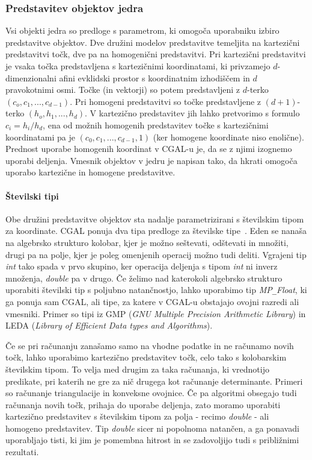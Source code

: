 \documentclass[a4paper, 12pt]{book}
\newcommand{\U}{\texttt{\_}}
\begin{document}
\subsubsection{Predstavitev objektov jedra}
Vsi objekti jedra so predloge s parametrom, ki omogoča uporabniku izbiro predstavitve objektov. Dve družini modelov predstavitve temeljita na kartezični predstavitvi točk, dve pa na homogenični predstavitvi. Pri kartezični predstavitvi je vsaka točka predstavljena s kartezičnimi koordinatami, ki privzamejo $d$-dimenzionalni afini evklidski prostor s koordinatnim izhodiščem in $d$ pravokotnimi osmi. Točke (in vektorji) so potem predstavljeni z $d$-terko $(c_o, c_1,..., c_{d-1})$. Pri homogeni predstavitvi so točke predstavljene z $(d+1)$-terko $(h_o, h_1,...,h_d)$. V kartezično predstavitev jih lahko pretvorimo s formulo $c_i = h_i/h_d$, ena od možnih homogenih predstavitev točke s kartezičnimi koordinatami pa je $(c_0, c_1,..., c_{d-1}, 1)$ (ker homogene koordinate niso enolične). Prednost uporabe homogenih koordinat v CGAL-u je, da se z njimi izognemo uporabi deljenja. Vmesnik objektov v jedru je napisan tako, da hkrati omogoča uporabo kartezične in homogene predstavitve. 

\paragraph*{Številski tipi}
Obe družini predstavitve objektov sta nadalje parametrizirani s številskim tipom za koordinate. CGAL ponuja dva tipa predloge za številske tipe~\cite{cgal:hhkps-nt-16b}. Eden se nanaša na algebrsko strukturo kolobar, kjer je možno seštevati, odštevati in množiti, drugi pa na polje, kjer je poleg omenjenih operacij možno tudi deliti. Vgrajeni tip \textit{int} tako spada v prvo skupino, ker operacija deljenja s tipom \textit{int} ni inverz množenja, \textit{double} pa v drugo. Če želimo nad katerokoli algebrsko strukturo uporabiti številski tip s poljubno natančnostjo, lahko uporabimo tip \textit{MP\U Float}, ki ga ponuja sam CGAL, ali tipe, za  katere v CGAL-u obstajajo ovojni razredi ali vmesniki. Primer so tipi iz GMP (\textit{GNU Multiple Precision Arithmetic Library}) in LEDA (\textit{Library of Efficient Data types and Algorithms}).

\bigbreak
Če se pri računanju zanašamo samo na vhodne podatke in ne računamo novih točk, lahko uporabimo kartezično predstavitev točk, celo tako s kolobarskim številskim tipom. To velja med drugim za taka računanja, ki vrednotijo predikate, pri katerih ne gre za nič drugega kot računanje determinante. Primeri so računanje triangulacije in konveksne ovojnice. Če pa algoritmi obsegajo tudi računanja novih točk, prihaja do uporabe deljenja, zato moramo uporabiti kartezično predstavitev s številskim tipom za polja - recimo \textit{double} - ali homogeno predstavitev. Tip \textit{double} sicer ni popolnoma natančen, a ga ponavadi uporabljajo tisti, ki jim je pomembna hitrost in se zadovoljijo tudi s približnimi rezultati.
\end{document}
